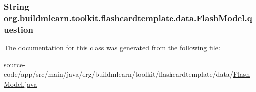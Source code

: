 \subsubsection[{\texorpdfstring{question}{question}}]{\setlength{\rightskip}{0pt plus 5cm}String org.\+buildmlearn.\+toolkit.\+flashcardtemplate.\+data.\+Flash\+Model.\+question\hspace{0.3cm}{\ttfamily [private]}}\hypertarget{classorg_1_1buildmlearn_1_1toolkit_1_1flashcardtemplate_1_1data_1_1FlashModel_ad1d14b3ffb4c0f780eb6701b527c37f7}{}\label{classorg_1_1buildmlearn_1_1toolkit_1_1flashcardtemplate_1_1data_1_1FlashModel_ad1d14b3ffb4c0f780eb6701b527c37f7}


The documentation for this class was generated from the following file\+:\begin{DoxyCompactItemize}
\item 
source-\/code/app/src/main/java/org/buildmlearn/toolkit/flashcardtemplate/data/\hyperlink{FlashModel_8java}{Flash\+Model.\+java}\end{DoxyCompactItemize}
